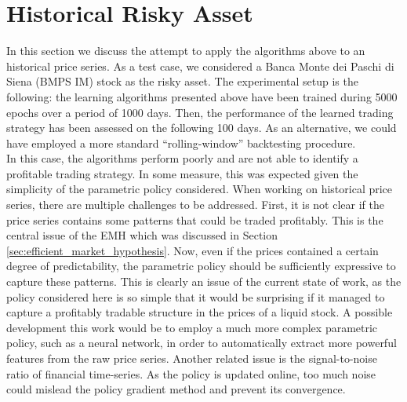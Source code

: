 \clearpage
\section{Historical Risky Asset}
In this section we discuss the attempt to apply the algorithms above to an historical price series. As a test case, we considered a Banca Monte dei Paschi di Siena (BMPS IM) stock as the risky asset. The experimental setup is the following: the learning algorithms presented above have been trained during 5000 epochs over a period of 1000 days. Then, the performance of the learned trading strategy has been assessed on the following 100 days. As an alternative, we could have employed a more standard ``rolling-window'' backtesting procedure.\\
In this case, the algorithms perform poorly and are not able to identify a profitable trading strategy. In some measure, this was expected given the simplicity of the parametric policy considered. When working on historical price series, there are multiple challenges to be addressed. First, it is not clear if the price series contains some patterns that could be traded profitably. This is the central issue of the \gls{EMH} which was discussed in Section \ref{sec:efficient_market_hypothesis}. Now, even if the prices contained a certain degree of predictability, the parametric policy should be sufficiently expressive to capture these patterns. This is clearly an issue of the current state of work, as the policy considered here is so simple that it would be surprising if it managed to capture a profitably tradable structure in the prices of a liquid stock. A possible development this work would be to employ a much more complex parametric policy, such as a neural network, in order to automatically extract more powerful features from the raw price series. Another related issue is the signal-to-noise ratio of financial time-series. As the policy is updated online, too much noise could mislead the policy gradient method and prevent its convergence.

